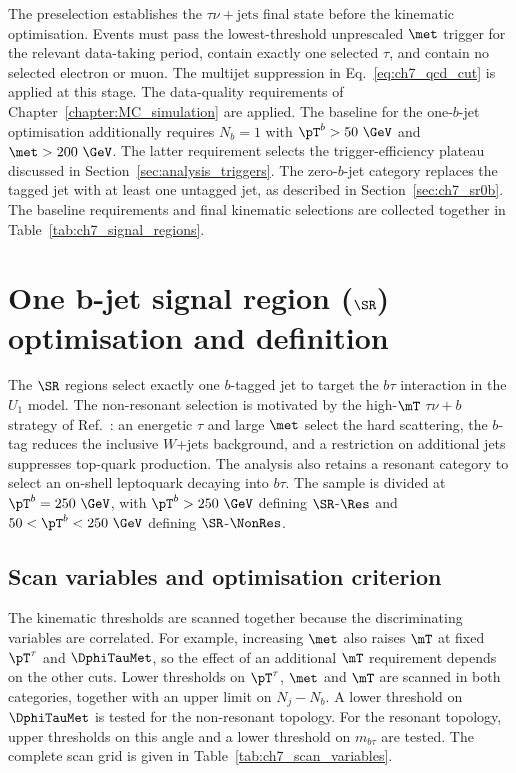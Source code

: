 The preselection establishes the $\tau\nu+\mathrm{jets}$ final state before the kinematic optimisation.
Events must pass the lowest-threshold unprescaled $\met$ trigger for the relevant data-taking period, contain exactly one selected $\tau$, and contain no selected electron or muon.
The multijet suppression in Eq.~\ref{eq:ch7_qcd_cut} is applied at this stage.
The data-quality requirements of Chapter~\ref{chapter:MC_simulation} are applied.
The baseline for the one-$b$-jet optimisation additionally requires $N_b=1$ with $\pT^b>50~\GeV$ and $\met>200~\GeV$.
The latter requirement selects the trigger-efficiency plateau discussed in Section~\ref{sec:analysis_triggers}.
The zero-$b$-jet category replaces the tagged jet with at least one untagged jet, as described in Section~\ref{sec:ch7_sr0b}.
The baseline requirements and final kinematic selections are collected together in Table~\ref{tab:ch7_signal_regions}.

\section[One b-jet signal region (SR1b) optimisation and definition]{One b-jet signal region ($\SR$) optimisation and definition}
\label{sec:ch7_sr1b}

The $\SR$ regions select exactly one $b$-tagged jet to target the $b\tau$ interaction in the $U_1$ model.
The non-resonant selection is motivated by the high-$\mT$ $\tau\nu+b$ strategy of Ref.~\cite{Endo2022NonResonant}: an energetic $\tau$ and large $\met$ select the hard scattering, the $b$-tag reduces the inclusive $W$+jets background, and a restriction on additional jets suppresses top-quark production.
The analysis also retains a resonant category to select an on-shell leptoquark decaying into $b\tau$.
The sample is divided at $\pT^b=250~\GeV$, with $\pT^b>250~\GeV$ defining $\SR$-$\Res$ and $50<\pT^b<250~\GeV$ defining $\SR$-$\NonRes$.

\subsection{Scan variables and optimisation criterion}
\label{subsec:ch7_scan}

The kinematic thresholds are scanned together because the discriminating variables are correlated.
For example, increasing $\met$ also raises $\mT$ at fixed $\pT^\tau$ and $\DphiTauMet$, so the effect of an additional $\mT$ requirement depends on the other cuts.
Lower thresholds on $\pT^\tau$, $\met$ and $\mT$ are scanned in both categories, together with an upper limit on $N_j-N_b$.
A lower threshold on $\DphiTauMet$ is tested for the non-resonant topology.
For the resonant topology, upper thresholds on this angle and a lower threshold on $m_{b\tau}$ are tested.
The complete scan grid is given in Table~\ref{tab:ch7_scan_variables}.

